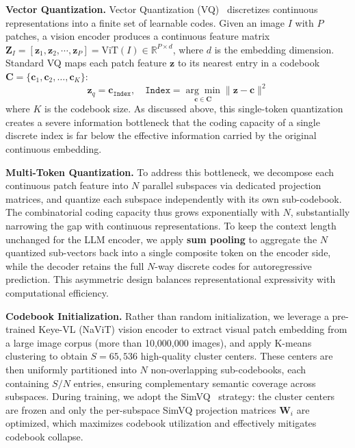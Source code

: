 \documentclass[11pt, a4paper, logo, copyright]{googledeepmind}
\begin{document}
\textbf{Vector Quantization.}
Vector Quantization (VQ)~\citep{van2017neural} discretizes continuous representations into a finite set of learnable codes. Given an image $I$ with $P$ patches, a vision encoder produces a continuous feature matrix $\mathbf{Z}_{I} = [\mathbf{z}_{1}, \mathbf{z}_{2}, \cdots, \mathbf{z}_{P}] = \mathrm{ViT}(I) \in \mathbb{R}^{P \times d}$, where $d$ is the embedding dimension. Standard VQ maps each patch feature $\mathbf{z}$ to its nearest entry in a codebook $\mathbf{C} = \{\mathbf{c}_{1}, \mathbf{c}_{2}, \ldots, \mathbf{c}_{K}\}$:
%
\begin{equation}
    \mathbf{z}_{q} = \mathbf{c}_{\texttt{Index}}, \quad \texttt{Index} = \underset{\mathbf{c} \in \mathbf{C}}{\arg\min} \big\| \mathbf{z} - \mathbf{c} \big\|^{2}
\end{equation}
%
where $K$ is the codebook size. As discussed above, this single-token quantization creates a severe information bottleneck that the coding capacity of a single discrete index is far below the effective information carried by the original continuous embedding.

\textbf{Multi-Token Quantization.}
To address this bottleneck, we decompose each continuous patch feature into $N$ parallel subspaces via dedicated projection matrices, and quantize each subspace independently with its own sub-codebook. The combinatorial coding capacity thus grows exponentially with $N$, substantially narrowing the gap with continuous representations.
%
To keep the context length unchanged for the LLM encoder, we apply \textbf{sum pooling
}to aggregate the $N$ quantized sub-vectors back into a single composite token on the encoder side, while the decoder retains the full $N$-way discrete codes for autoregressive prediction. This asymmetric design balances representational expressivity with computational efficiency.

\textbf{Codebook Initialization.}
Rather than random initialization, we leverage a pre-trained Keye-VL (NaViT) vision encoder to extract visual patch embedding from a large image corpus (more than 10,000,000 images), and apply K-means clustering to obtain $S = 65{,}536$ high-quality cluster centers. These centers are then uniformly partitioned into $N$ non-overlapping sub-codebooks, each containing $S / N$ entries, ensuring complementary semantic coverage across subspaces. During training, we adopt the SimVQ~\citep{zhu2025addressing} strategy: the cluster centers are frozen and only the per-subspace SimVQ projection matrices $\mathbf{W}_i$ are optimized, which maximizes codebook utilization and effectively mitigates codebook collapse.
\end{document}
